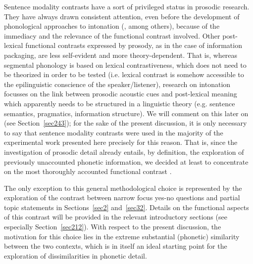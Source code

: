 Sentence modality contrasts have a sort of privileged status in prosodic research. They have always drawn consistent attention, even before the development of phonological approaches to intonation (\citealt{kretschmer1938ursprung}, among others), because of the immediacy and the relevance of the functional contrast involved. Other post-lexical functional contrasts expressed by prosody, as in the case of information packaging, are less self-evident and more theory-dependent. That is, whereas segmental phonology is based on lexical contrastiveness, which does not need to be theorized in order to be tested (i.e. lexical contrast is somehow accessible to the epilinguistic conscience of the speaker/listener), research on intonation focusses on the link between prosodic acoustic cues and post-lexical meaning which apparently needs to be structured in a linguistic theory (e.g. sentence semantics, pragmatics, information structure). We will comment on this later on (see Section~\ref{sec243}); for the sake of the present discussion, it is only necessary to say that sentence modality contrasts were used in the majority of the experimental work presented here precisely for this reason. That is, since the investigation of prosodic detail already entails, by definition, the exploration of previously unaccounted phonetic information, we decided at least to concentrate on the most thoroughly accounted functional contrast \citep{huddleston1994contrast,haan2002speaking}.

The only exception to this general methodological choice is represented by the exploration of the contrast between narrow focus yes-no questions and partial topic statements in Sections~\ref{sec2} and~\ref{sec32}. Details on the functional aspects of this contrast will be provided in the relevant introductory sections (see especially Section~\ref{sec212}). With respect to the present discussion, the motivation for this choice lies in the extreme substantial (phonetic) similarity between the two contexts, which is in itself an ideal starting point for the exploration of dissimilarities in phonetic detail.